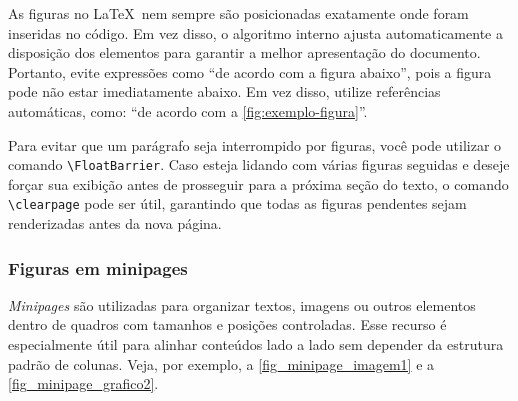 As figuras no \LaTeX\ nem sempre são posicionadas exatamente onde foram inseridas no código. Em vez disso, o algoritmo interno ajusta automaticamente a disposição dos elementos para garantir a melhor apresentação do documento. Portanto, evite expressões como ``de acordo com a figura abaixo'', pois a figura pode não estar imediatamente abaixo. Em vez disso, utilize referências automáticas, como: ``de acordo com a \autoref{fig:exemplo-figura}''.

Para evitar que um parágrafo seja interrompido por figuras, você pode utilizar o comando \verb|\FloatBarrier|. Caso esteja lidando com várias figuras seguidas e deseje forçar sua exibição antes de prosseguir para a próxima seção do texto, o comando \verb|\clearpage| pode ser útil, garantindo que todas as figuras pendentes sejam renderizadas antes da nova página.

\subsubsection{Figuras em minipages}
\emph{Minipages} são utilizadas para organizar textos, imagens ou outros elementos dentro de quadros com tamanhos e posições controladas. Esse recurso é especialmente útil para alinhar conteúdos lado a lado sem depender da estrutura padrão de colunas. Veja, por exemplo, a \autoref{fig_minipage_imagem1} e a \autoref{fig_minipage_grafico2}.


